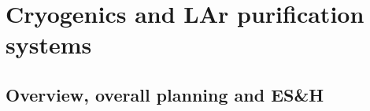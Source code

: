 








\section{Cryogenics and LAr purification systems}
\label{sec:cryo-purif}

\subsection{Overview, overall planning and ES\&H}

